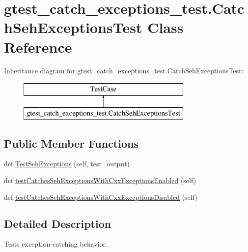 \hypertarget{classgtest__catch__exceptions__test_1_1_catch_seh_exceptions_test}{}\section{gtest\+\_\+catch\+\_\+exceptions\+\_\+test.\+Catch\+Seh\+Exceptions\+Test Class Reference}
\label{classgtest__catch__exceptions__test_1_1_catch_seh_exceptions_test}
Inheritance diagram for gtest\+\_\+catch\+\_\+exceptions\+\_\+test.\+Catch\+Seh\+Exceptions\+Test\+:\begin{figure}[H]
\begin{center}
\leavevmode
\includegraphics[height=2.000000cm]{classgtest__catch__exceptions__test_1_1_catch_seh_exceptions_test}
\end{center}
\end{figure}
\subsection*{Public Member Functions}
\begin{DoxyCompactItemize}
\item 
def \hyperlink{classgtest__catch__exceptions__test_1_1_catch_seh_exceptions_test_a737bbcc64405854aa8e0aea87ca5850b}{Test\+Seh\+Exceptions} (self, test\+\_\+output)
\item 
def \hyperlink{classgtest__catch__exceptions__test_1_1_catch_seh_exceptions_test_a02d06790fb52416a9da6a28b624e9cd9}{test\+Catches\+Seh\+Exceptions\+With\+Cxx\+Exceptions\+Enabled} (self)
\item 
def \hyperlink{classgtest__catch__exceptions__test_1_1_catch_seh_exceptions_test_a4a181de9de2b147eff55ed7a1d7d40c4}{test\+Catches\+Seh\+Exceptions\+With\+Cxx\+Exceptions\+Disabled} (self)
\end{DoxyCompactItemize}


\subsection{Detailed Description}
\begin{DoxyVerb}Tests exception-catching behavior.\end{DoxyVerb}
 

